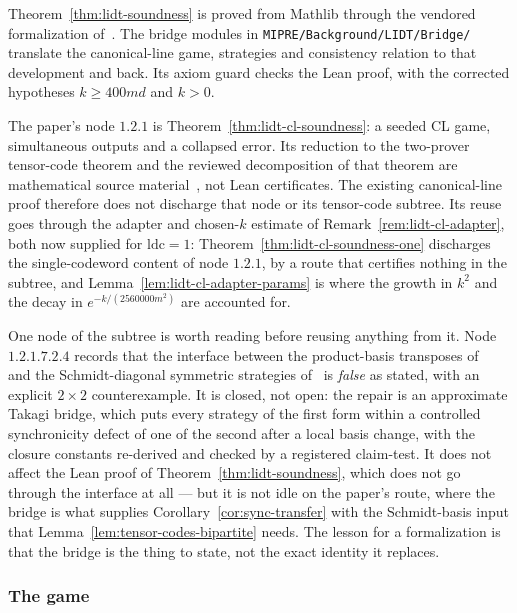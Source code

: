 \begin{remark}
\label{rem:lidt-formalized}
Theorem~\ref{thm:lidt-soundness} is proved from Mathlib through the vendored
formalization of~\cite{JNVWY21qld}. The bridge modules in
\texttt{MIPRE/Background/LIDT/Bridge/} translate the canonical-line game, strategies
and consistency relation to that development and back. Its axiom guard checks the
Lean proof, with the corrected hypotheses $k\geq400md$ and $k>0$.

The paper's node $1.2.1$ is Theorem~\ref{thm:lidt-cl-soundness}: a seeded CL game,
simultaneous outputs and a collapsed error. Its reduction to the two-prover
tensor-code theorem and the reviewed decomposition of that theorem are mathematical
source material~\cite{AuditSync26}, not Lean certificates. The existing canonical-line
proof therefore does not discharge that node or its tensor-code subtree. Its reuse goes
through the adapter and chosen-$k$ estimate of Remark~\ref{rem:lidt-cl-adapter}, both now
supplied for $\mathrm{ldc}=1$: Theorem~\ref{thm:lidt-cl-soundness-one} discharges the
single-codeword content of node $1.2.1$, by a route that certifies nothing in the subtree, and
Lemma~\ref{lem:lidt-cl-adapter-params} is where the growth in $k^2$ and the decay in
$e^{-k/(2560000m^2)}$ are accounted for.

One node of the subtree is worth reading before reusing anything from it. Node
$1.2.1.7.2.4$ records that the interface between the product-basis transposes
of~\cite{JNVWY20} and the Schmidt-diagonal symmetric strategies of~\cite{Vid22} is
\emph{false} as stated, with an explicit $2 \times 2$ counterexample. It is closed, not
open: the repair is an approximate Takagi bridge, which puts every strategy of the first
form within a controlled synchronicity defect of one of the second after a local basis
change, with the closure constants re-derived and checked by a registered claim-test. It
does not affect the Lean proof of Theorem~\ref{thm:lidt-soundness}, which does not go through
the interface at all --- but it is not idle on the paper's route, where the bridge is what
supplies Corollary~\ref{cor:sync-transfer} with the Schmidt-basis input that
Lemma~\ref{lem:tensor-codes-bipartite} needs. The lesson for a formalization is that the
bridge is the thing to state, not the exact identity it replaces.
\end{remark}

\subsubsection{The game}

